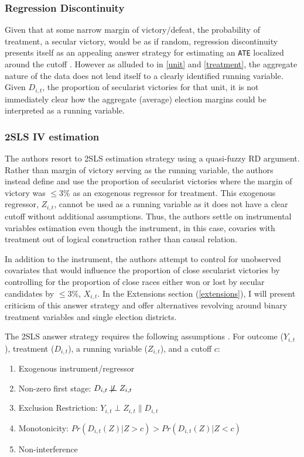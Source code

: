 \documentclass{scrartcl}
\begin{document}
\subsubsection{Regression Discontinuity}
Given that at some narrow margin of victory/defeat, the probability of treatment, a secular victory, would be as if random, regression discontinuity presents itself as an appealing answer strategy for estimating an \texttt{ATE} localized around the cutoff \cite{Cattaneo_2019}. 
However as alluded to in \ref{unit} and \ref{treatment}, the aggregate nature of the data does not lend itself to a clearly identified running variable.
Given $D_{i,t}$, the proportion of secularist victories for that unit, it is not immediately clear how the aggregate (average) election margins could be interpreted as a running variable. 

\subsubsection{2SLS IV estimation} \label{iv}

The authors resort to 2SLS estimation strategy using a quasi-fuzzy RD argument.
Rather than margin of victory serving as the running variable, the authors instead define and use the proportion of secularist victories where the margin of victory was $ \leq 3\%$ as an exogenous regressor for treatment.
This exogenous regressor, $Z_{i,t}$, cannot be used as a running variable as it does not have a clear cutoff without additional assumptions.
Thus, the authors settle on instrumental variables estimation even though the instrument, in this case, covaries with treatment out of logical construction rather than causal relation.

In addition to the instrument, the authors attempt to control for unobserved covariates that would influence the proportion of close secularist victories by controlling for the proportion of close races either won or lost by secular candidates by $\leq 3\%$, $X_{i,t}$.
In the Extensions section (\ref{extensions}), I will present criticism of this answer strategy and offer alternatives revolving around binary treatment variables and single election districts.

The 2SLS answer strategy requires the following assumptions \cite{morgan_2015, Imbens_2008, Cattaneo_2019}.
For outcome ($Y_{i,t}$), treatment ($D_{i,t}$), a running variable ($Z_{i,t}$), and a cutoff $c$:
\begin{enumerate}
\item{Exogenous instrument/regressor}
\item{Non-zero first stage: $D_{i,t} \not\!\perp\!\!\!\perp Z_{i,t}$}
\item{Exclusion Restriction: $Y_{i,t} \perp Z_{i,t} \| D_{i,t}$}
\item{Monotonicity}: $Pr(D_{i,t}(Z) | Z > c) > Pr(D_{i,t}(Z) | Z < c)$
\item{Non-interference}
\end{enumerate}
\end{document}
